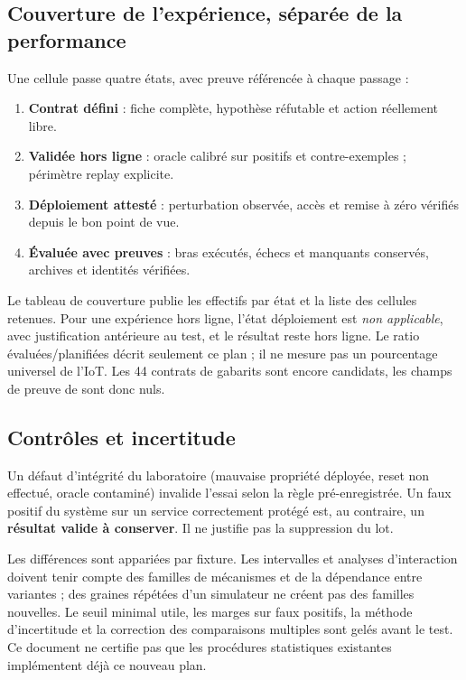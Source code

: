\documentclass[11pt,a4paper]{article}
\newcommand{\code}[1]{{\small\ttfamily\path{#1}}}
\begin{document}
\subsection{Couverture de l'expérience, séparée de la performance}
Une cellule passe quatre états, avec preuve référencée à chaque passage :
\begin{enumerate}
\item \textbf{Contrat défini} : fiche complète, hypothèse réfutable et action réellement libre.
\item \textbf{Validée hors ligne} : oracle calibré sur positifs et contre-exemples ; périmètre replay explicite.
\item \textbf{Déploiement attesté} : perturbation observée, accès et remise à zéro vérifiés depuis le bon point de vue.
\item \textbf{Évaluée avec preuves} : bras exécutés, échecs et manquants conservés, archives et identités vérifiées.
\end{enumerate}
Le tableau de couverture publie les effectifs par état et la liste des cellules retenues. Pour une expérience hors ligne, l'état déploiement est \emph{non applicable}, avec justification antérieure au test, et le résultat reste hors ligne. Le ratio évaluées/planifiées décrit seulement ce plan ; il ne mesure pas un pourcentage universel de l'IoT. Les 44 contrats de gabarits sont encore candidats, les champs de preuve de \code{coverage-plan.json} sont donc nuls.

\subsection{Contrôles et incertitude}
Un défaut d'intégrité du laboratoire (mauvaise propriété déployée, reset non effectué, oracle contaminé) invalide l'essai selon la règle pré-enregistrée. Un faux positif du système sur un service correctement protégé est, au contraire, un \textbf{résultat valide à conserver}. Il ne justifie pas la suppression du lot.

Les différences sont appariées par fixture. Les intervalles et analyses d'interaction doivent tenir compte des familles de mécanismes et de la dépendance entre variantes ; des graines répétées d'un simulateur ne créent pas des familles nouvelles. Le seuil minimal utile, les marges sur faux positifs, la méthode d'incertitude et la correction des comparaisons multiples sont gelés avant le test. Ce document ne certifie pas que les procédures statistiques existantes implémentent déjà ce nouveau plan.
\end{document}
